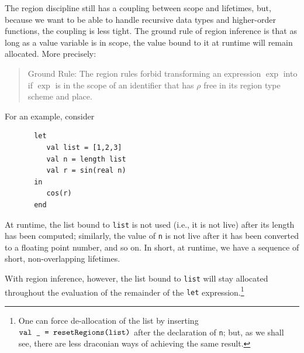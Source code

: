 \documentclass[12pt]{book}
\begin{document}
The region discipline still has a coupling between scope and lifetimes,
but, because we want to be able to handle recursive data types and higher-order
functions, the coupling is less tight. 
The ground rule of region inference
is that as long as a value variable is in scope, the value bound to it
at runtime will remain allocated. More precisely:
\begin{quote}
       Ground Rule: The region rules forbid transforming an expression
       $\exp$ into  if $\exp$ is
       in the scope of an identifier that has $\rho$ free in its region type
       scheme and place.
\end{quote}
For an example, consider
\begin{verbatim}
       let 
          val list = [1,2,3]
          val n = length list
          val r = sin(real n)
       in
          cos(r)
       end
\end{verbatim} 
At runtime, the list bound to {\tt list} is not used (i.e., it is not live) 
after its length has been computed;
similarly, the value of {\tt n} is not live after it has been converted to a floating point
number, and so on. In short, at runtime, we have a sequence of short, non-overlapping
lifetimes. 

With region inference, however, the list bound to {\tt list} will stay allocated
throughout the evaluation of the remainder of the {\tt let} expression.\footnote{One can
force de-allocation of the list by  inserting 
$\hbox{\tt val \_ = \hbox{\tt resetRegions}(list)}$ after the declaration of {\tt n}; but, as we shall see,
there are less draconian ways of achieving the same result.} 
\end{document}
